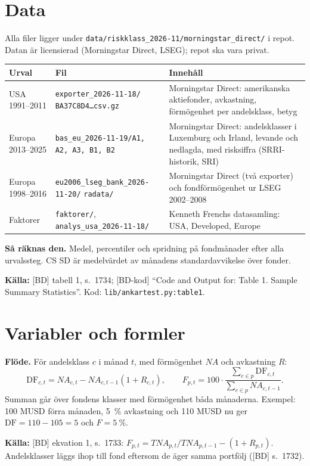 \documentclass[10pt,a4paper]{article}
\newcommand{\kalla}[1]{\par\noindent\textbf{Källa:} #1\par}
\newcommand{\raknas}{\par\noindent\textbf{Så räknas den.} }
\newcommand{\kod}[1]{\texttt{#1}}
\begin{document}
\section{Data}
Alla filer ligger under \kod{data/riskklass\_2026-11/morningstar\_direct/} i repot. Datan är licensierad (Morningstar Direct, LSEG); repot ska vara privat.

{\small\begin{tabular}{@{}p{2.6cm}p{7.2cm}p{5.6cm}@{}}
\toprule
Urval & Fil & Innehåll \\
\midrule
USA 1991--2011 & \kod{exporter\_2026-11-18/} \kod{BA37C8D4\ldots csv.gz} & Morningstar Direct: amerikanska aktiefonder, avkastning, förmögenhet per andelsklass, betyg \\
Europa 2013--2025 & \kod{bas\_eu\_2026-11-19/A1, A2, A3, B1, B2} & Morningstar Direct: andelsklasser i Luxemburg och Irland, levande och nedlagda, med risksiffra (SRRI-historik, SRI) \\
Europa 1998--2016 & \kod{eu2006\_lseg\_bank\_2026-11-20/} \kod{radata/} & Morningstar Direct (två exporter) och fondförmögenhet ur LSEG 2002--2008 \\
Faktorer & \kod{faktorer/}, \kod{analys\_usa\_2026-11-18/} & Kenneth Frenchs datasamling: USA, Developed, Europe \\
\bottomrule
\end{tabular}}

\begin{table}[H]
\caption{Summary statistics. Fund-month observations. Flow is the monthly net flow in percent of the fund's assets a month earlier. The return measures are 18-month exponentially weighted averages of monthly excess returns and alphas, in percent per month. CS SD is the average of the monthly cross-sectional standard deviations (Panel D: the pooled standard deviation). The last three columns give the values in Table 1 of Ben-David et al.\ (2022).}
\centering\resizebox{\textwidth}{!}{}
\end{table}
\raknas Medel, percentiler och spridning på fondmånader efter alla urvalssteg. CS SD är medelvärdet av månadens standardavvikelse över fonder.
\kalla{[BD] tabell 1, s.~1734; [BD-kod] ``Code and Output for: Table 1. Sample Summary Statistics''. Kod: \kod{lib/ankartest.py:table1}.}

\section{Variabler och formler}\label{sec:var}
\textbf{Flöde.} För andelsklass $c$ i månad $t$, med förmögenhet $NA$ och avkastning $R$:
\begin{equation}
\text{DF}_{c,t}=NA_{c,t}-NA_{c,t-1}(1+R_{c,t}),\qquad
F_{p,t}=100\cdot\frac{\sum_{c\in p}\text{DF}_{c,t}}{\sum_{c\in p}NA_{c,t-1}} .
\end{equation}
Summan går över fondens klasser med förmögenhet båda månaderna. Exempel: 100 MUSD förra månaden, 5~\% avkastning och 110 MUSD nu ger $\text{DF}=110-105=5$ och $F=5~\%$.
\kalla{[BD] ekvation 1, s.~1733: $F_{p,t}=TNA_{p,t}/TNA_{p,t-1}-(1+R_{p,t})$. Andelsklasser läggs ihop till fond eftersom de äger samma portfölj ([BD] s.~1732).}
\end{document}
